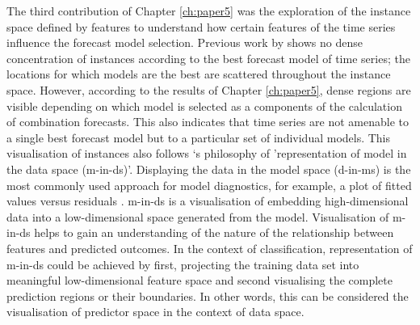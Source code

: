 \documentclass{monashthesis}
\begin{document}
The third contribution of Chapter \ref{ch:paper5} was the exploration of the instance space defined by features to understand how certain features of the time series influence the forecast model selection. Previous work by \textcite{kang2017visualising} shows no dense concentration of instances according to the best forecast model of time series; the locations for which models are the best are scattered throughout the instance space. However, according to the results of Chapter \ref{ch:paper5}, dense regions are visible depending on which model is selected as a components of the calculation of combination forecasts. This also indicates that time series are not amenable to a single best forecast model but to a particular set of individual models. This visualisation of instances also follows \textcite{wickham2015visualizing}`s philosophy of 'representation of model in the data space (m-in-ds)'. Displaying the data in the model space (d-in-ms) is the most commonly used approach for model diagnostics, for example, a plot of fitted values versus residuals \autocite{wickham2015visualizing}. m-in-ds is a visualisation of embedding high-dimensional data into a low-dimensional space generated from the model. Visualisation of m-in-ds helps to gain an understanding of the nature of the relationship between features and predicted outcomes. In the context of classification, representation of m-in-ds could be achieved by first, projecting the training data set into meaningful low-dimensional feature space and second visualising the complete prediction regions or their boundaries. In other words, this can be considered the visualisation of predictor space in the context of data space.
\end{document}
